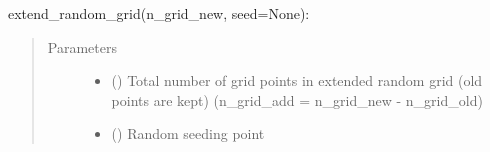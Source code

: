 \documentclass[letterpaper,10pt,english,openany,oneside]{sphinxmanual}
\begin{document}
\begin{fulllineitems}
\begin{fulllineitems}
extend\_random\_grid(n\_grid\_new, seed=None):
\begin{quote}\begin{description}
\item[{Parameters}] \leavevmode\begin{itemize}
\item {} 
 () \textendash{} Total number of grid points in extended random grid (old points are kept)
(n\_grid\_add = n\_grid\_new - n\_grid\_old)

\item {} 
 (\sphinxstyleliteralemphasis{\sphinxupquote{, }}\sphinxstyleliteralemphasis{\sphinxupquote{, }}) \textendash{} Random seeding point

\end{itemize}

\end{description}\end{quote}

\end{fulllineitems}


\end{fulllineitems}

\end{document}
